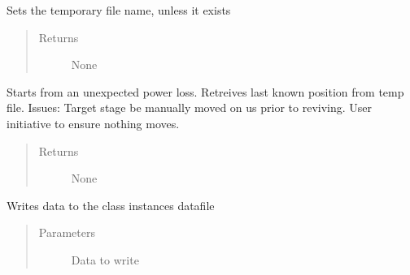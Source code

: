 \documentclass[letterpaper,10pt,english]{sphinxmanual}
\begin{document}
\begin{fulllineitems}
\begin{fulllineitems}
\end{fulllineitems}


\begin{fulllineitems}
\label{\detokenize{index:droogCNC.TwoAxisStage.__setTempFile}}
\sphinxAtStartPar
Sets the temporary file name, unless it exists
\begin{quote}\begin{description}
\item[{Returns}] \leavevmode
\sphinxAtStartPar
None

\end{description}\end{quote}

\end{fulllineitems}


\begin{fulllineitems}
\label{\detokenize{index:droogCNC.TwoAxisStage.__startFromDeath}}
\sphinxAtStartPar
Starts from an unexpected power loss. Retreives last known position from temp file.
Issues: Target stage  be manually moved on us prior to reviving. User initiative to ensure
nothing moves.
\begin{quote}\begin{description}
\item[{Returns}] \leavevmode
\sphinxAtStartPar
None

\end{description}\end{quote}

\end{fulllineitems}


\begin{fulllineitems}
\label{\detokenize{index:droogCNC.TwoAxisStage.__writeData}}
\sphinxAtStartPar
Writes data to the class instances datafile
\begin{quote}\begin{description}
\item[{Parameters}] \leavevmode
\sphinxAtStartPar
{} \textendash{} Data to write


\end{description}
\end{quote}
\end{fulllineitems}
\end{fulllineitems}
\end{document}
